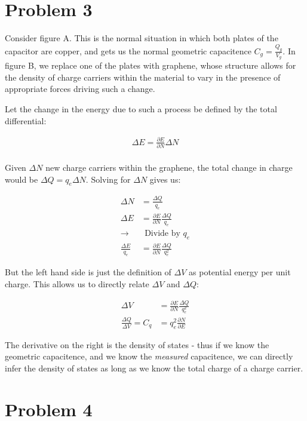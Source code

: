 \documentclass[paper=a4, fontsize=11pt]{scrartcl} %
\numberwithin{equation}{section} %
\numberwithin{figure}{section} %
\numberwithin{table}{section} %
\begin{document}
\section{Problem 3}

Consider figure A. This is the normal situation in which both plates of the capacitor are copper, and gets us the normal geometric capacitence $C_g = \frac{Q_g}{V_g}$. In figure B, we replace one of the plates with graphene, whose structure allows for the density of charge carriers within the material to vary in the presence of appropriate forces driving such a change. 

Let the change in the energy due to such a process be defined by the total differential:

\begin{align}
\Delta E = \frac{\partial E}{\partial N} \Delta N \\
\end{align}

Given $\Delta N$ new charge carriers within the graphene, the total change in charge would be $\Delta Q = q_e \Delta N$. Solving for $\Delta N$ gives us:

\begin{align}
\Delta N &= \frac{\Delta Q}{q_e} \\
\Delta E &= \frac{\partial E}{\partial N} \frac{\Delta Q}{q_e} \\
\rightarrow & \ \ \text{Divide by $q_e$} \\
\frac{\Delta E}{q_e} &= \frac{\partial E}{\partial N}\frac{\Delta Q}{q_e^2}
\end{align}

But the left hand side is just the definition of $\Delta V$ as potential energy per unit charge. This allows us to directly relate $\Delta V$ and $\Delta Q$:

\begin{align}
\Delta V &= \frac{\partial E}{\partial N}\frac{\Delta Q}{q_e^2} \\
\frac{\Delta Q}{\Delta V} = C_q &= q_e^2 \frac{\partial N}{\partial E}
\end{align}

The derivative on the right is the density of states - thus if we know the geometric capacitence, and we know the \textit{measured} capacitence, we can directly infer the density of states as long as we know the total charge of a charge carrier.

\section{Problem 4}
\end{document}
